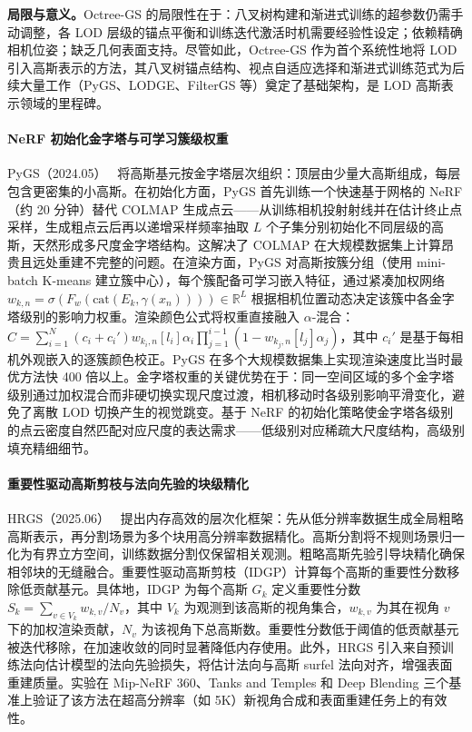 \textbf{局限与意义。}Octree-GS 的局限性在于：八叉树构建和渐进式训练的超参数仍需手动调整，各 LOD 层级的锚点平衡和训练迭代激活时机需要经验性设定；依赖精确相机位姿；缺乏几何表面支持。尽管如此，Octree-GS 作为首个系统性地将 LOD 引入高斯表示的方法，其八叉树锚点结构、视点自适应选择和渐进式训练范式为后续大量工作（PyGS、LODGE、FilterGS 等）奠定了基础架构，是 LOD 高斯表示领域的里程碑。

\paragraph{NeRF 初始化金字塔与可学习簇级权重}

PyGS（2024.05）~\cite{2405_16829} 将高斯基元按金字塔层次组织：顶层由少量大高斯组成，每层包含更密集的小高斯。在初始化方面，PyGS 首先训练一个快速基于网格的 NeRF（约 20 分钟）替代 COLMAP 生成点云——从训练相机投射射线并在估计终止点采样，生成粗点云后再以递增采样频率抽取 $L$ 个子集分别初始化不同层级的高斯，天然形成多尺度金字塔结构。这解决了 COLMAP 在大规模数据集上计算昂贵且远处重建不完整的问题。在渲染方面，PyGS 对高斯按簇分组（使用 mini-batch K-means 建立簇中心），每个簇配备可学习嵌入特征，通过紧凑加权网络 $w_{k,n} = \sigma(F_w(\text{cat}(E_k, \gamma(x_n)))) \in \mathbb{R}^L$ 根据相机位置动态决定该簇中各金字塔级别的影响力权重。渲染颜色公式将权重直接融入 $\alpha$-混合：$C = \sum_{i=1}^{N}(c_i + c_i') w_{k_i,n}[l_i] \alpha_i \prod_{j=1}^{i-1}(1 - w_{k_j,n}[l_j]\alpha_j)$，其中 $c_i'$ 是基于每相机外观嵌入的逐簇颜色校正。PyGS 在多个大规模数据集上实现渲染速度比当时最优方法快 400 倍以上。金字塔权重的关键优势在于：同一空间区域的多个金字塔级别通过加权混合而非硬切换实现尺度过渡，相机移动时各级别影响平滑变化，避免了离散 LOD 切换产生的视觉跳变。基于 NeRF 的初始化策略使金字塔各级别的点云密度自然匹配对应尺度的表达需求——低级别对应稀疏大尺度结构，高级别填充精细细节。

\paragraph{重要性驱动高斯剪枝与法向先验的块级精化}

HRGS（2025.06）~\cite{2506_14229} 提出内存高效的层次化框架：先从低分辨率数据生成全局粗略高斯表示，再分割场景为多个块用高分辨率数据精化。高斯分割将不规则场景归一化为有界立方空间，训练数据分割仅保留相关观测。粗略高斯先验引导块精化确保相邻块的无缝融合。重要性驱动高斯剪枝（IDGP）计算每个高斯的重要性分数移除低贡献基元。具体地，IDGP 为每个高斯 $G_k$ 定义重要性分数 $S_k = \sum_{v \in V_k} w_{k,v} / N_v$，其中 $V_k$ 为观测到该高斯的视角集合，$w_{k,v}$ 为其在视角 $v$ 下的加权渲染贡献，$N_v$ 为该视角下总高斯数。重要性分数低于阈值的低贡献基元被迭代移除，在加速收敛的同时显著降低内存使用。此外，HRGS 引入来自预训练法向估计模型的法向先验损失，将估计法向与高斯 surfel 法向对齐，增强表面重建质量。实验在 Mip-NeRF 360、Tanks and Temples 和 Deep Blending 三个基准上验证了该方法在超高分辨率（如 5K）新视角合成和表面重建任务上的有效性。

